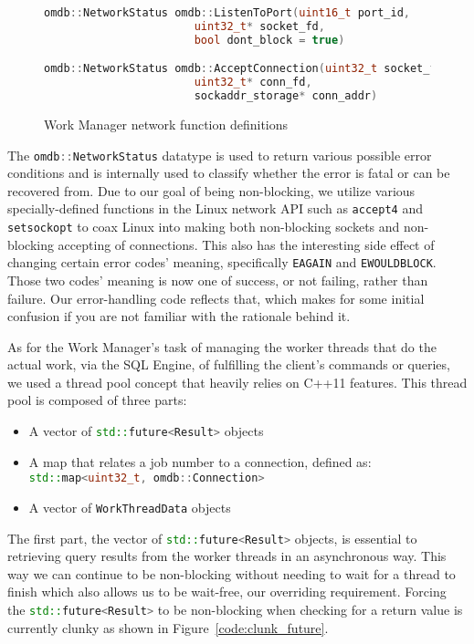 \documentclass[letterpaper, 11pt]{article}
\newcommand{\inlinecode}[1]{\colorbox{codegrey}{\lstinline[language=C++]{#1}}}
\begin{document}
  \begin{figure}[H]
  \begin{lstlisting}[language=C++]
omdb::NetworkStatus omdb::ListenToPort(uint16_t port_id,
				       uint32_t* socket_fd,
				       bool dont_block = true)

omdb::NetworkStatus omdb::AcceptConnection(uint32_t socket_fd,
					   uint32_t* conn_fd,
					   sockaddr_storage* conn_addr)
  \end{lstlisting}
  \caption{Work Manager network function definitions}
  \label{code:work_manager_func_def}
  \end{figure}
  The \inlinecode{omdb::NetworkStatus} datatype is used to return various
  possible error conditions and is internally used to classify whether the error is fatal
  or can be recovered from. Due to our goal of being non-blocking, we utilize various specially-defined
  functions in the Linux network API such as \inlinecode{accept4} and
  \inlinecode{setsockopt} to coax Linux into making both non-blocking
  sockets and non-blocking accepting of connections. This also has the interesting side effect of
  changing certain error codes' meaning, specifically \inlinecode{EAGAIN} and
  \inlinecode{EWOULDBLOCK}. Those two codes' meaning is now one of success, or not
  failing, rather than failure. Our error-handling code reflects that, which makes for some initial
  confusion if you are not familiar with the rationale behind it.
  \par\vspace{\baselineskip}
  As for the Work Manager's task of managing the worker threads that do the actual work, via the
  SQL Engine, of fulfilling the client's commands or queries, we used a thread pool concept that
  heavily relies on C++11 features. This thread pool is composed of three parts:
  \begin{itemize}
   \item A vector of \inlinecode{std::future<Result>} objects
   \item A map that relates a job number to a connection, defined as:\\
	 \inlinecode{std::map<uint32_t, omdb::Connection>}
   \item A vector of \inlinecode{WorkThreadData} objects
  \end{itemize}
  The first part, the vector of \inlinecode{std::future<Result>} objects, is
  essential to retrieving query results from the worker threads in an asynchronous way. This way
  we can continue to be non-blocking without needing to wait for a thread to finish which also
  allows us to be wait-free, our overriding requirement. Forcing the \inlinecode{std::future<Result>}
  to be non-blocking when checking for a return value is currently clunky as shown in Figure~\ref{code:clunk_future}.
  \par\vspace{\baselineskip}
  
\end{document}
